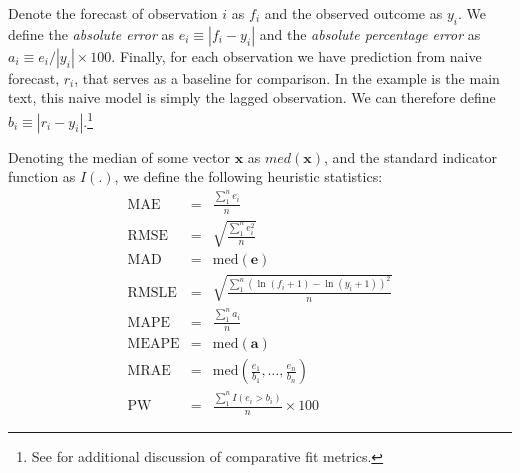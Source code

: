 \documentclass[12pt,fullpage,endnotes]{article}
\begin{document}
Denote the forecast of observation $i$ as $f_i$ and the observed
outcome as $y_i$.  We define the \textit{absolute error} as $e_i\equiv |f_i - y_i|$ and the \textit{absolute percentage error} as $a_i \equiv e_i / |y_i| \times 100$.  Finally, for each observation we have prediction from naive forecast, $r_i$, that serves as a baseline for comparison.  In the example is the main text, this naive model is simply the lagged observation.  We can therefore define $b_i \equiv |r_i - y_i|$.\footnote{See \citet{brandt:freeman:schrodt:2011} for additional discussion of comparative fit metrics.}

Denoting the median of some vector $\mathbf{x}$ as $med(\mathbf{x})$, and the standard indicator function as $I(.)$, we define the following heuristic statistics:
 \begin{eqnarray*}
 \mathrm{MAE} &=& \frac{\sum_1^n{e_i}}{n}\\
  \mathrm{RMSE} &=& \sqrt{\frac{\sum_1^n{e^2_i}}{n}} \\
  \mathrm{MAD} &=& \mathrm{med}(\mathbf{e}) \\
  \mathrm{RMSLE} &=& \sqrt{\frac{\sum_1^n\left(\ln(f_i+1) - \ln(y_i+1)  \right)^2}{n}} \\
  \mathrm{MAPE} &=& \frac{\sum_1^n{a_i}}{n} \\
   \mathrm{MEAPE} &=& \mathrm{med}(\mathbf{a}) \\
 \mathrm{MRAE} &=& \mathrm{med}\left(\frac{e_1}{b_1}, \ldots, \frac{e_n}{b_n} \right) \\
 \mathrm{PW} &=& \frac{\sum_1^nI(e_i > b_i)}{n} \times 100
\end{eqnarray*}
\end{document}
